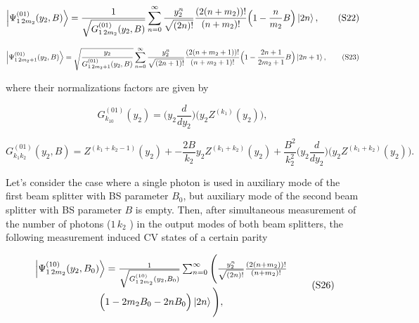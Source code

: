 \documentclass{optica-article}
\begin{document}
\begin{equation}\label{eq:S22}
    \ket{\Psi_{1\,2m_2}^{(01)}(y_2,B)} =
    \frac{1}{\sqrt{G_{1\,2m_2}^{(01)}(y_2,B)}}\sum_{n=0}^{\infty} \frac{y_2^{n}}{\sqrt{(2n)!}}\frac{(2(n+m_2))!}{(n+m_2)!}\Big(1-\frac{n}{m_2}B\Big)\ket{2n},  
\tag{S22}
\end{equation}



\begin{equation}\label{eq:S23}
    \ket{\Psi_{1\,2m_2+1}^{(01)}(y_2,B)} =
    \sqrt{\frac{y_2}{G_{1\,2m_2+1}^{(01)}(y_2,B)}}\sum_{n=0}^{\infty} \frac{y_2^{n}}{\sqrt{(2n+1)!}}\frac{(2(n+m_2+1))!}{(n+m_2+1)!}\Big(1-\frac{2n+1}{2m_2+1}B\Big)\ket{2n+1},  
\tag{S23}
\end{equation}



\!\!\!\!\!\!where their normalizations factors are given by



\begin{equation}\label{eq:S24}
    G_{k_10}^{(01)}(y_2) = \Big(y_2\frac{d}{dy_2}\Big)\Big(y_2Z^{(k_1)}(y_2)\Big) 
\tag{S24},
\end{equation}



\begin{equation}\label{eq:S25}
    G_{k_1k_2}^{(01)}(y_2,B) = Z^{(k_1+k_2-1)}(y_2) + -\frac{2B}{k_2}y_2Z^{(k_1+k_2)}(y_2) + \frac{B^2}{k_2^2}\Big(y_2\frac{d}{dy_2}\Big)\Big(y_2Z^{(k_1+k_2)}(y_2)\Big). 
\tag{S25}
\end{equation}



\par Let's consider the case where a single photon is used in auxiliary mode of the first beam splitter with BS parameter $B_0$, but auxiliary mode of the second beam splitter with BS parameter $B$ is empty. Then, after simultaneous measurement of the number of photons ($1\,k_2$ ) in the output modes of both beam splitters, the following measurement induced CV states of a certain parity


\begin{equation}\label{eq:S26}
    \begin{array}{c}
         \ket{\Psi_{1\,2m_2}^{(10)}(y_2,B_0)} =
         \frac{1}{\sqrt{G_{1\,2m_2}^{(10)}(y_2,B_0)}}\sum_{n=0}^{\infty} \Bigg (\frac{y_2^{n}}{\sqrt{(2n)!}}
         \frac{(2(n+m_2))!}{(n+m_2)!}\\
         \Big(1-2m_2B_0-2nB_0\Big)\ket{2n}\Bigg),
    \end{array}
    \tag{S26}
\end{equation}
\end{document}

